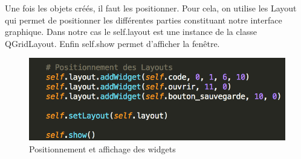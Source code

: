 \documentclass[a4paper,12pt]{article}
\begin{document}
		Une fois les objets créés, il faut les positionner. Pour cela, on utilise les Layout qui permet de positionner les différentes parties constituant notre interface graphique. Dans notre cas le self.layout est une instance de la classe QGridLayout. Enfin self.show permet d'afficher la fenêtre. 

		\begin{figure}[!h]

			\begin{center}

				\includegraphics[scale=0.8]{"images/Layout"}

				\caption{Positionnement et affichage des widgets}
			\end{center}

		\end{figure}

		
\end{document}
